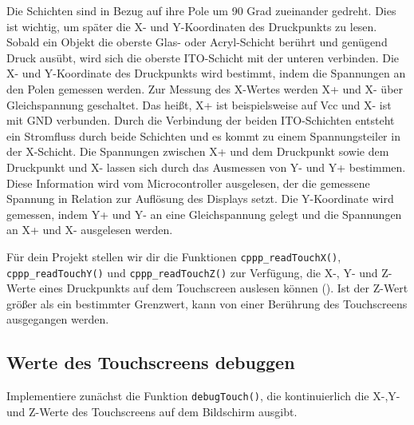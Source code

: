 Die Schichten sind in Bezug auf ihre Pole um 90 Grad zueinander gedreht.
Dies ist wichtig, um später die X- und Y-Koordinaten des Druckpunkts zu lesen.
Sobald ein Objekt die oberste Glas- oder Acryl-Schicht berührt und genügend Druck ausübt, wird sich die oberste ITO-Schicht mit der unteren verbinden.
Die X- und Y-Koordinate des Druckpunkts wird bestimmt, indem die Spannungen an den Polen gemessen werden.
Zur Messung des X-Wertes werden X+ und X- über Gleichspannung geschaltet.
Das heißt, X+ ist beispielsweise auf Vcc und X- ist mit GND verbunden.
Durch die Verbindung der beiden ITO-Schichten entsteht ein Stromfluss durch beide Schichten und es kommt zu einem Spannungsteiler in der X-Schicht.
Die Spannungen zwischen X+ und dem Druckpunkt sowie dem Druckpunkt und X- lassen sich durch das Ausmessen von Y- und Y+ bestimmen.
Diese Information wird vom Microcontroller ausgelesen, der die gemessene Spannung in Relation zur Auflösung des Displays setzt.
Die Y-Koordinate wird gemessen, indem Y+ und Y- an eine Gleichspannung gelegt und die Spannungen an X+ und X- ausgelesen werden.

Für dein Projekt stellen wir dir die Funktionen \lstinline|cppp_readTouchX()|, \lstinline|cppp_readTouchY()| und \lstinline|cppp_readTouchZ()| zur Verfügung, die X-, Y- und Z-Werte eines Druckpunkts auf dem Touchscreen auslesen können ().
Ist der Z-Wert größer als ein bestimmter Grenzwert, kann von einer Berührung des Touchscreens ausgegangen werden. 


\subsection{Werte des Touchscreens debuggen}
Implementiere zunächst die Funktion \lstinline|debugTouch()|, die kontinuierlich die X-,Y- und Z-Werte des Touchscreens auf dem Bildschirm ausgibt.

